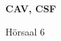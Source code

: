 \documentclass[a4paper]{article}
\begin{document}
\printGenericVSLHeader
\begin{center}
\begin{vsltext}{3cm}{4cm}

   \vspace{0.5cm} 

    \textbf{CAV, CSF} 

    \vspace{1.5cm}

    Hörsaal 6

\end{vsltext}

\end{center}
\end{document}
